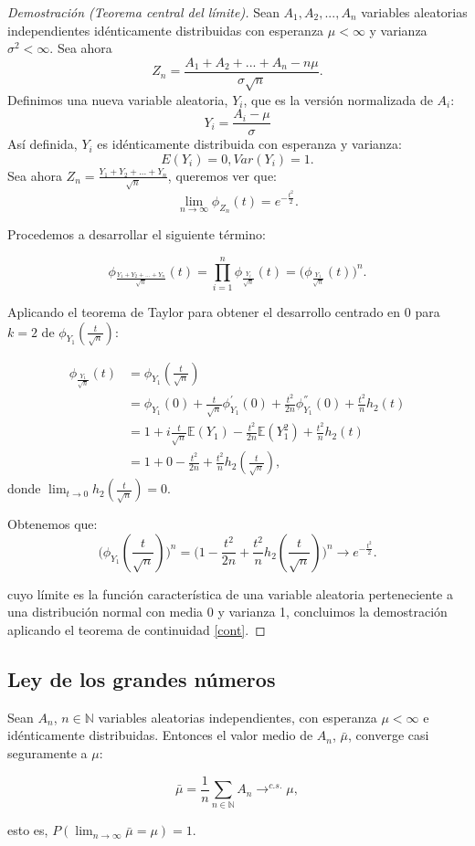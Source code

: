 \documentclass[../proyecto.tex]{memoir}
\begin{document}
\begin{proof}[Demostración (Teorema central del límite)]

Sean $A_{1},A_{2},...,A_{n}$ variables aleatorias independientes idénticamente distribuidas con esperanza $\mu < \infty$ y varianza $\sigma^2< \infty$.
Sea ahora $$
Z_{n} = \frac{A_{1}+A_{2}+...+A_{n}-n\mu }{\sigma \sqrt{n}}.
$$
Definimos una nueva variable aleatoria, $Y_i$, que es la versión normalizada de $A_i$:$$
Y_i=\frac{A_i-\mu}{\sigma}
$$
Así definida, $Y_i$ es idénticamente distribuida con esperanza y varianza: $$
E(Y_{i}) = 0,  Var(Y_{i})=1.
$$
Sea ahora $Z_n = \frac{Y_1+Y_2+...+Y_n}{\sqrt{n}}$, queremos ver que: $$
\lim_{n \to \infty} \phi_{Z_{n}}(t)=e^{-\frac{t^{2}}{2}}.
$$

Procedemos a desarrollar el siguiente término:

$$
\phi_{\frac{Y_1+Y_2+...+Y_n}{\sqrt{n}}}(t) = \prod_{i=1}^{n} \phi_{\frac{Y_i}{\sqrt{n}}} (t) = \big(\phi_{\frac{Y_1}{\sqrt{n}}}(t) \big)^n.
$$

Aplicando el teorema de Taylor para obtener el desarrollo centrado en 0 para $k=2$ de $\phi_{Y_1}(\frac{t}{\sqrt{n}})$: 

\begin{align*}
\phi_{\frac{Y_1}{\sqrt{n}}}(t) &= \phi_{Y_1}(\frac{t}{\sqrt{n}}) \\
  &= \phi_{Y_1}(0) + \frac{t}{\sqrt{n}}\phi_{Y_1}^{'}(0) + \frac{t^2}{2n}\phi_{Y_1}^{''}(0) + \frac{t^2}{n} h_2(t)\\
 &= 1 + i\frac{t}{\sqrt{n}}\mathds{E}(Y_1) - \frac{t^2}{2n}\mathds{E}(Y_1^2) + \frac{t^2}{n} h_2(t)\\
 &= 1 + 0 - \frac{t^2}{2n} + \frac{t^2}{n} h_2(\frac{t}{\sqrt{n}}),
\end{align*}
donde $\lim_{t\to 0} h_2(\frac{t}{\sqrt{n}}) = 0$.

Obtenemos que: $$
\big(\phi_{Y_1}(\frac{t}{\sqrt{n}}) \big)^n =\big( 1 - \frac{t^2}{2n} + \frac{t^2}{n} h_2(\frac{t}{\sqrt{n}}) \big)^n\longrightarrow e^{-\frac{t^2}{2}}.
$$

cuyo límite es la función característica de una variable aleatoria perteneciente a una distribución normal con media 0 y varianza 1, concluimos la demostración aplicando el teorema de continuidad \ref{cont}.
\end{proof}

\subsection{Ley de los grandes números}
\begin{teorema} \label{teo_grandes_numeros}
Sean $A_n$, $n \in \mathds{N}$ variables aleatorias independientes, con esperanza $\mu < \infty$ e idénticamente distribuidas. Entonces el valor medio de $A_n$, $\bar{\mu}$, converge casi seguramente a $\mu$:

$$
\bar{\mu}=\frac{1}{n}\sum_{n\in\mathds{N}} A_n \to^{c.s.} \mu,
$$

esto es, $P(\lim_{n\to\infty} \bar{\mu}=\mu) = 1$.

\end{teorema}
\end{document}
